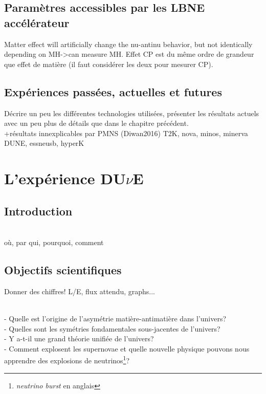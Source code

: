             
            
        \subsection{Paramètres accessibles par les LBNE accélérateur}\label{sec::param_lbne}
                
             Matter effect will artificially change the nu-antinu behavior, but not identically depending on MH->can measure MH. Effet CP est du même ordre de grandeur que effet de matière (il faut considérer les deux pour mesurer CP).
             
        \subsection{Expériences passées, actuelles et futures}
            Décrire un peu les différentes technologies utilisées, présenter les résultats actuels avec un peu plus de détails que dans le chapitre précédent.\\
            +résultats innexplicables par PMNS (Diwan2016)
            T2K, nova, minos, minerva
            \cite{Diwan2016}\\
            DUNE, essneusb, hyperK
            
        
    \section{L'expérience \texorpdfstring{DU$\nu$E}{DUNE}}
    
        \subsection{Introduction}
            \cite{Acciarri2016}\\
            où, par qui, pourquoi, comment

        \subsection{Objectifs scientifiques}
            Donner des chiffres! L/E, flux attendu, graphs...
        
            \cite{Collaboration2015}\\
            - Quelle est l'origine de l'asymétrie matière-antimatière dans l'univers?\\
            - Quelles sont les symétries fondamentales sous-jacentes de l'univers?\\
            - Y a-t-il une grand théorie unifiée de l'univers?\\
            - Comment explosent les supernovae et quelle nouvelle physique pouvons nous apprendre des explosions de neutrinos\footnote{\textit{neutrino burst} en anglais}?\\
            
